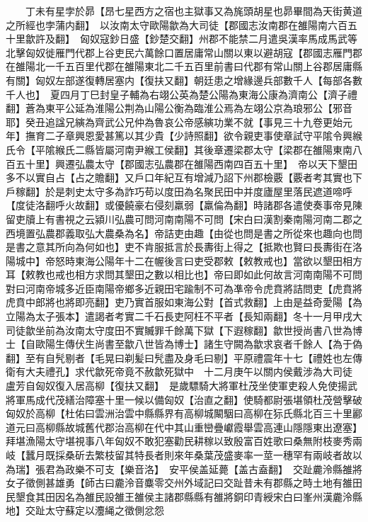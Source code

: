 　　丁未有星孛於昴【昂七星西方之宿也主獄事又為旄頭胡星也昴畢間為天街黄道之所經也孛蒲内翻】　以汝南太守歐陽歙為大司徒【郡國志汝南郡在雒陽南六百五十里歙許及翻】　匈奴寇鈔日盛【鈔楚交翻】州郡不能禁二月遣吳漢率馬成馬武等北擊匈奴徙雁門代郡上谷吏民六萬餘口置居庸常山關以東以避胡寇【郡國志雁門郡在雒陽北一千五百里代郡在雒陽東北二千五百里前書曰代郡有常山關上谷郡居庸縣有關】匈奴左部遂復轉居塞内【復扶又翻】朝廷患之增緣邊兵部數千人【每部各數千人也】　夏四月丁巳封皇子輔為右翊公英為楚公陽為東海公康為濟南公【濟子禮翻】蒼為東平公延為淮陽公荆為山陽公衡為臨淮公焉為左翊公京為琅邪公【邪音耶】癸丑追諡兄縯為齊武公兄仲為魯哀公帝感縯功業不就【事見三十九卷更始元年】撫育二子章興恩愛甚篤以其少貴【少詩照翻】欲令親吏事使章試守平隂令興緱氏令【平隂緱氏二縣皆屬河南尹緱工侯翻】其後章遷梁郡太守【梁郡在雒陽東南八百五十里】興遷弘農太守【郡國志弘農郡在雒陽西南四百五十里】　帝以天下墾田多不以實自占【占之贍翻】又戶口年紀互有增減乃詔下州郡檢覈【覈者考其實也下戶稼翻】於是刺史太守多為詐巧苟以度田為名聚民田中并度廬屋里落民遮道啼呼【度徒洛翻呼火故翻】或優饒豪右侵刻羸弱【羸倫為翻】時諸郡各遣使奏事帝見陳留吏牘上有書視之云潁川弘農可問河南南陽不可問【宋白曰漢割秦南陽河南二郡之西境置弘農郡義取弘大農桑為名】帝詰吏由趣【由從也問是書之所從來也趣向也問是書之意其所向為何如也】吏不肯服抵言於長夀街上得之【抵欺也賢曰長夀街在洛陽城中】帝怒時東海公陽年十二在幄後言曰吏受郡敕【敕教戒也】當欲以墾田相方耳【敕教也戒也相方求問其墾田之數以相比也】帝曰即如此何故言河南南陽不可問對曰河南帝城多近臣南陽帝鄉多近親田宅踰制不可為凖帝令虎賁將詰問吏【虎賁將虎賁中郎將也將即亮翻】吏乃實首服如東海公對【首式救翻】上由是益奇愛陽【為立陽為太子張本】遣謁者考實二千石長吏阿枉不平者【長知兩翻】冬十一月甲戌大司徒歙坐前為汝南太守度田不實贓罪千餘萬下獄【下遐稼翻】歙世授尚書八世為博士【自歐陽生傳伏生尚書至歙八世皆為博士】諸生守闕為歙求哀者千餘人【為于偽翻】至有自髠剔者【毛晃曰剃髪曰髠盡及身毛曰剔】平原禮震年十七【禮姓也左傳衛有大夫禮孔】求代歙死帝竟不赦歙死獄中　十二月庚午以關内侯戴涉為大司徒　盧芳自匈奴復入居高柳【復扶又翻】　是歲驃騎大將軍杜茂坐使軍吏殺人免使揚武將軍馬成代茂繕治障塞十里一候以備匈奴【治直之翻】使騎都尉張堪領杜茂營擊破匈奴於高柳【杜佑曰雲洲治雲中縣縣界有高柳城闞駰曰高柳在狋氏縣北百三十里酈道元曰高柳縣故城舊代郡治高柳在代中其山重巒疊巘霞舉雲高連山隱隱東出遼塞】拜堪漁陽太守堪視事八年匈奴不敢犯塞勸民耕稼以致殷富百姓歌曰桑無附枝麥秀兩岐【蠶月既採桑斫去繁枝留其特長者則來年桑葉茂盛麥率一莖一穗罕有兩岐者故以為瑞】張君為政樂不可支【樂音洛】　安平侯盖延薨【盖古盍翻】　交趾麊泠縣雒將女子徵側甚雄勇【師古曰麊泠音麋零交州外域記曰交趾昔未有郡縣之時土地有雒田民墾食其田因名為雒民設雒王雒侯主諸郡縣縣有雒將銅印青綬宋白曰峯州漢麊泠縣地】交趾太守蘇定以灋䋲之徵側忿怨

